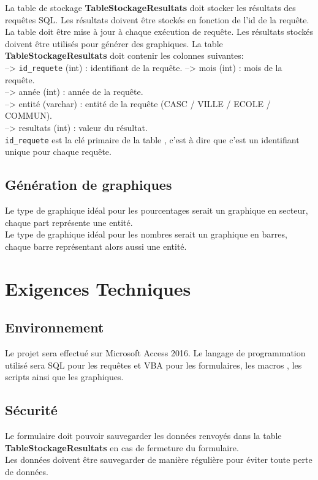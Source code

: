 \documentclass[a4paper,12pt]{article}
\begin{document}
La table de stockage \textbf{TableStockageResultats} doit stocker les résultats des requêtes SQL. Les résultats doivent être stockés en fonction de l'id de la requête. La table doit être mise à jour à chaque exécution de requête. Les résultats stockés doivent être utilisés pour générer des graphiques.
La table \textbf{TableStockageResultats} doit contenir les colonnes suivantes: \\
\noindent --> \texttt{id\_requete} (int) : identifiant de la requête.
\noindent --> mois (int) : mois de la requête. \\
\noindent --> année (int) : année de la requête. \\
\noindent --> entité (varchar) : entité de la requête (CASC / VILLE / ECOLE / COMMUN). \\
\noindent --> resultats (int) : valeur du résultat. \\
\noindent \texttt{id\_requete} est la clé primaire de la table , c'est à dire que c'est un identifiant unique pour chaque requête.



\subsection{Génération de graphiques}
Le type de graphique idéal pour les pourcentages serait un graphique en secteur, chaque part représente une entité. \\
Le type de graphique idéal pour les nombres serait un graphique en barres, chaque barre représentant alors aussi une entité. \\


\section{Exigences Techniques}
\subsection{Environnement}
Le projet sera effectué sur Microsoft Access 2016. Le langage de programmation utilisé sera SQL pour les requêtes et VBA pour les formulaires, les macros , les scripts ainsi que les graphiques.


\subsection{Sécurité}
Le formulaire doit pouvoir sauvegarder les données renvoyés dans la table \textbf{TableStockageResultats} en cas de fermeture du formulaire. \\
Les données doivent être sauvegarder de manière régulière pour éviter toute perte de données. \\
\end{document}
